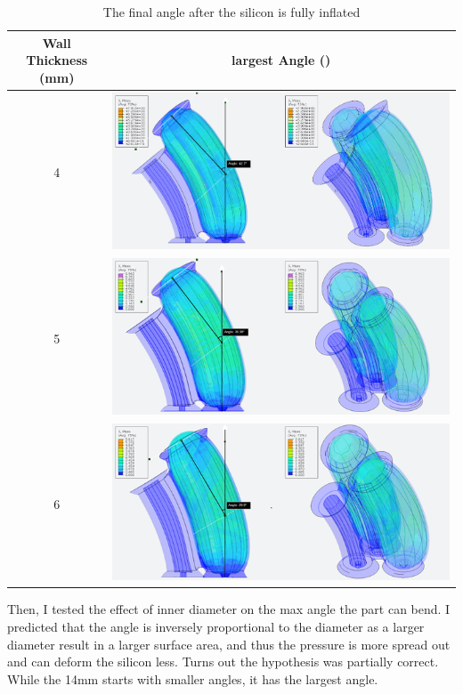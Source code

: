 \documentclass[twoside]{article}
\begin{document}
\begin{table} [H]
	\centering
	\begin{tabular}{|c|c|}
	\hline
	Wall Thickness (mm) & largest Angle (\degree)\\\hline
	4 & \includegraphics[align=c, scale=0.75]{wall4}\\\hline
	5 & \includegraphics[align=c, scale=0.75]{wall5}\\\hline
	6 & \includegraphics[align=c, scale=0.75]{wall6}\\\hline
	\end{tabular}
	\caption{The final angle after the silicon is fully inflated}
\end{table}

Then, I tested the effect of inner diameter on the max angle the part can bend. I predicted that the angle is inversely proportional to the diameter as a larger diameter result in a larger surface area, and thus the pressure is more spread out and can deform the silicon less. Turns out the hypothesis was partially correct. While the 14mm starts with smaller angles, it has the largest angle.
\end{document}
